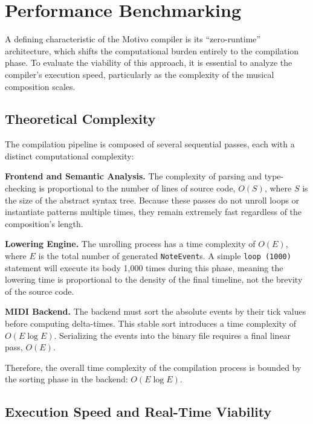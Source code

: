 

\section{Performance Benchmarking}\label{detail-sec:evaluation-benchmarking}

A defining characteristic of the Motivo compiler is its ``zero-runtime'' architecture, which shifts the
computational burden entirely to the compilation phase.
To evaluate the viability of this approach, it is essential to analyze the compiler's execution speed, particularly as
the complexity of the musical composition scales.

\subsection{Theoretical Complexity}\label{detail-subsec:theoretical-complexity}

The compilation pipeline is composed of several sequential passes, each with a distinct computational complexity:

\noindent \textbf{Frontend and Semantic Analysis.} The complexity of parsing and type-checking is proportional to the
number of lines of source code, $O(S)$, where $S$ is the size of the abstract syntax tree.
Because these passes do not unroll loops or instantiate patterns multiple times, they remain extremely fast
regardless of the composition's length.

\noindent \textbf{Lowering Engine.} The unrolling process has a time complexity of $O(E)$, where $E$ is the total number
of generated \texttt{NoteEvent}s. A simple \texttt{loop (1000)} statement will execute its body 1,000 times during
this phase, meaning the lowering time is proportional to the density of the final timeline, not the brevity of the
source code.

\noindent \textbf{MIDI Backend.} The backend must sort the absolute events by their tick values before computing
delta-times.
This stable sort introduces a time complexity of $O(E \log E)$.
Serializing the events into the binary file requires a final linear pass, $O(E)$.

Therefore, the overall time complexity of the compilation process is bounded by the sorting phase in the backend:
$O(E \log E)$.

\subsection{Execution Speed and Real-Time Viability}\label{detail-subsec:execution-speed-and-real-time-viability}

